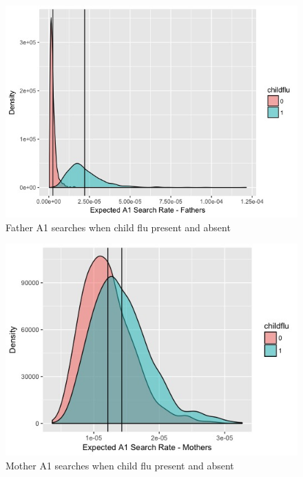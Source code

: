 \documentclass[12pt]{article}
\begin{document}
\begin{figure}[!htbp]
\begin{centering}
   \includegraphics[width=.6\textwidth]{Exp_A1_Fathers}
  \caption{Father A1 searches when child flu present and absent}
\label{fathers_a1}
\end{centering}
\end{figure}

\begin{figure}[!htbp]
\begin{centering}
   \includegraphics[width=.6\textwidth]{Exp_A1_Mothers}
  \caption{Mother A1 searches when child flu present and absent}
\label{mothers_a1}
\end{centering}
\end{figure}
\end{document}

